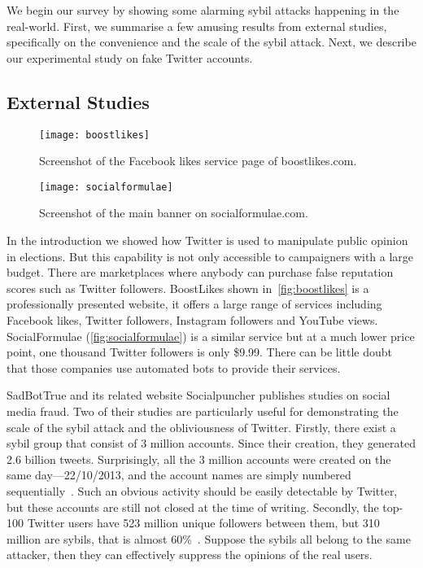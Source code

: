 We begin our survey by showing some alarming sybil attacks happening in the
real-world. First, we summarise a few amusing results from external studies,
specifically on the convenience and the scale of the sybil attack. Next, we
describe our experimental study on fake Twitter accounts.

\subsection{External Studies}
\label{sec:external-studies}

\begin{figure}
  \centering
  \texttt{[image: boostlikes]}
  \caption{Screenshot of the Facebook likes service page of boostlikes.com.}
  \label{fig:boostlikes}
\end{figure}

\begin{figure*}
  \centering
  \texttt{[image: socialformulae]}
  \caption{Screenshot of the main banner on socialformulae.com.}
  \label{fig:socialformulae}
\end{figure*}

In the introduction we showed how Twitter is used to manipulate public opinion
in elections. But this capability is not only accessible to campaigners with a
large budget. There are marketplaces where anybody can purchase false reputation
scores such as Twitter followers. BoostLikes shown in~\autoref{fig:boostlikes}
is a professionally presented website, it offers a large range of services
including Facebook likes, Twitter followers, Instagram followers and YouTube
views. SocialFormulae (\autoref{fig:socialformulae}) is a similar service but at
a much lower price point, one thousand Twitter followers is only \$9.99. There
can be little doubt that those companies use automated bots to provide their
services.

SadBotTrue and its related website Socialpuncher publishes studies on social
media fraud. Two of their studies are particularly useful for demonstrating the
scale of the sybil attack and the obliviousness of Twitter. Firstly, there exist
a sybil group that consist of 3 million accounts. Since their creation, they
generated 2.6 billion tweets. Surprisingly, all the 3 million accounts were
created on the same day---22/10/2013, and the account names are simply numbered
sequentially~\cite{sadbottrue}. Such an obvious activity should be easily
detectable by Twitter, but these accounts are still not closed at the time of
writing. Secondly, the top-100 Twitter users have 523 million unique followers
between them, but 310 million are sybils, that is almost
60\%~\cite{socialpuncher}. Suppose the sybils all belong to the same attacker,
then they can effectively suppress the opinions of the real users.

